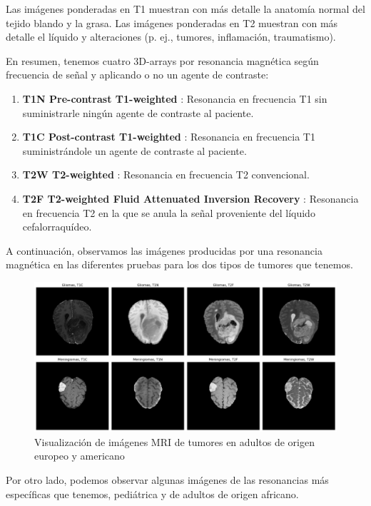 Las imágenes ponderadas en T1 muestran con más detalle la anatomía normal del tejido blando y la grasa. Las imágenes ponderadas en T2 muestran con más detalle el líquido y alteraciones (p. ej., tumores, inflamación, traumatismo). 

En resumen, tenemos cuatro 3D-arrays por resonancia magnética según frecuencia de señal y aplicando o no un agente de contraste:

\begin{enumerate}
	\item \textbf{T1N Pre-contrast T1-weighted} :  Resonancia en frecuencia T1 sin suministrarle ningún agente de contraste al paciente.
	\item \textbf{T1C Post-contrast T1-weighted} : Resonancia en frecuencia T1 suministrándole un agente de contraste al paciente.
	\item \textbf{T2W T2-weighted} : Resonancia en frecuencia T2 convencional.
	\item \textbf{T2F T2-weighted Fluid Attenuated Inversion Recovery} : Resonancia en frecuencia T2 en la que se anula la señal proveniente del líquido cefalorraquídeo.
\end{enumerate}

A continuación, observamos las imágenes producidas por una resonancia magnética en las diferentes pruebas para los dos tipos de tumores que tenemos.

\begin{figure}[!h]
	\centering
	\includegraphics[width=1.0\linewidth]{imagenes/introduccion_imagenesMRI.png}
	\caption{Visualización de imágenes MRI de tumores en adultos de origen europeo y americano}
	\label{fig:visual0}
\end{figure}

Por otro lado, podemos observar algunas imágenes de las resonancias más específicas que tenemos, pediátrica y de adultos de origen africano.

